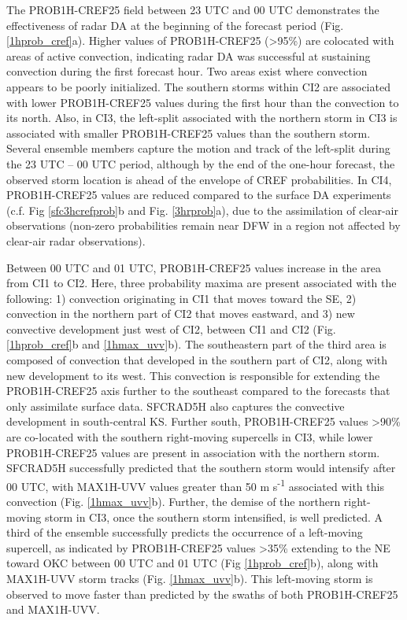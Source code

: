 The PROB1H-CREF25 field between 23 UTC and 00 UTC demonstrates the effectiveness of radar DA at the beginning of the forecast period (Fig. \ref{1hprob_cref}a). Higher values of PROB1H-CREF25 (\textgreater 95\%) are colocated with areas of active convection, indicating radar DA was successful at sustaining convection during the first forecast hour. Two areas exist where convection appears to be poorly initialized. The southern storms within CI2 are associated with lower PROB1H-CREF25 values during the first hour than the convection to its north. Also, in CI3, the left-split associated with the northern storm in CI3 is associated with smaller PROB1H-CREF25 values than the southern storm. Several ensemble members capture the motion and track of the left-split during the 23 UTC -- 00 UTC period, although by the end of the one-hour forecast, the observed storm location is ahead of the envelope of CREF probabilities. In CI4, PROB1H-CREF25 values are reduced compared to the surface DA experiments (c.f. Fig \ref{sfc3hcrefprob}b and Fig. \ref{3hrprob}a), due to the assimilation of clear-air observations (non-zero probabilities remain near DFW in a region not affected by clear-air radar observations).

Between 00 UTC and 01 UTC, PROB1H-CREF25 values increase in the area from CI1 to CI2. Here, three probability maxima are present associated with the following: 1) convection originating in CI1 that moves toward the SE, 2) convection in the northern part of CI2 that moves eastward, and 3) new convective development just west of CI2, between CI1 and CI2 (Fig. \ref{1hprob_cref}b and \ref{1hmax_uvv}b). The southeastern part of the third area is composed of convection that developed in the southern part of CI2, along with new development to its west. This convection is responsible for extending the PROB1H-CREF25 axis further to the southeast compared to the forecasts that only assimilate surface data. SFCRAD5H also captures the convective development in south-central KS. Further south, PROB1H-CREF25 values \textgreater 90\% are co-located with the southern right-moving supercells in CI3, while lower PROB1H-CREF25 values are present in association with the northern storm. SFCRAD5H successfully predicted that the southern storm would intensify after 00 UTC, with MAX1H-UVV values greater than 50 m s\textsuperscript{-1} associated with this convection (Fig. \ref{1hmax_uvv}b). Further, the demise of the northern right-moving storm in CI3, once the southern storm intensified, is well predicted. A third of the ensemble successfully predicts the occurrence of a left-moving supercell, as indicated by PROB1H-CREF25 values \textgreater 35\% extending to the NE toward OKC between 00 UTC and 01 UTC (Fig \ref{1hprob_cref}b), along with MAX1H-UVV storm tracks (Fig. \ref{1hmax_uvv}b). This left-moving storm is observed to move faster than predicted by the swaths of both PROB1H-CREF25 and MAX1H-UVV.

